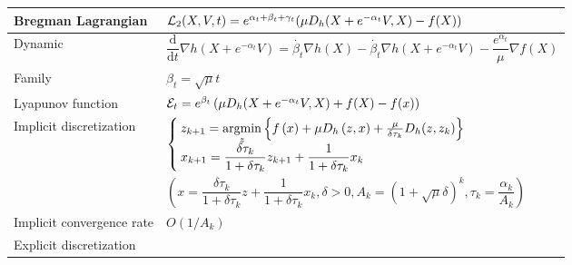 \begin{table}[ht]
    \centering
    \begin{tabular}{|l|l|}
        \hline
        Bregman Lagrangian        & $\mathcal{L}_2(X,V,t) = e^{\alpha_t+\beta_t+\gamma_t}(\mu D_h(X+e^{-\alpha_t}V, X)- f(X))$                                                                                          \\
        \hline
        Dynamic                   & $\dfrac{\mathrm{d}}{\mathrm{d}t}\nabla h(X + e^{-\alpha_t}V) = \dot{\beta_t}\nabla h(X) - \dot{\beta_t}\nabla h(X + e^{-\alpha_t}V) -\dfrac{e^{\alpha_t}}{\mu}\nabla f(X)$ \\
        \hline
        Family                    & $\beta_t = \sqrt{\mu}t$                                                                                                                                                    \\
        \hline
        Lyapunov function         & $\mathcal{E}_t = e^{\beta_t}\left(\mu D_h(X+e^{-\alpha_t}V, X) + f(X) - f(x)\right)$                                                                                                \\
        \hline
        \multirow{2}{*}{Implicit discretization }
                                  & $\begin{cases}
                                             z_{k+1} = \operatorname*{argmin}\limits_{z}\left\{f\left(x \right) + \mu D_h\left(z, x\right) + \frac{\mu}{\delta\tau_k}D_h(z,z_k)\right\} \\
                                             x_{k+1} = \dfrac{\delta\tau_k}{1+\delta\tau_k}z_{k+1} + \dfrac{1}{1+\delta\tau_k}x_k
                                         \end{cases}$                                               \\

                                  & $(x = \dfrac{\delta\tau_k}{1+\delta\tau_k}z + \dfrac{1}{1+\delta\tau_k}x_k,  \delta > 0, A_k = (1+\sqrt{\mu}\delta)^k, \tau_k = \dfrac{\alpha_k}{A_k})$                    \\
        \hline
        Implicit convergence rate & $O\left(1/A_k\right)$                                                                                                                                                      \\
        \hline
        \multirow{1}{*}{Explicit discretization }


\end{tabular}
\end{table}
